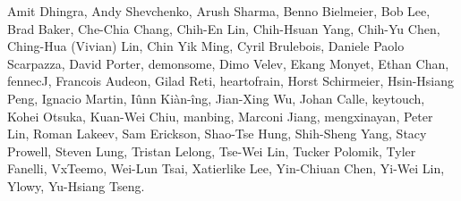 Amit Dhingra,                  %
Andy Shevchenko,               %
Arush Sharma,                  %
Benno Bielmeier,               %
Bob Lee,                       %
Brad Baker,                    %
Che-Chia Chang,                %
Chih-En Lin,                   %
Chih-Hsuan Yang,               %
Chih-Yu Chen,                  %
Ching-Hua (Vivian) Lin,        %
Chin Yik Ming,                 %
Cyril Brulebois,               %
Daniele Paolo Scarpazza,       %
David Porter,                  %
demonsome,                     %
Dimo Velev,                    %
Ekang Monyet,                  %
Ethan Chan,                    %
fennecJ,                       %
Francois Audeon,               %
Gilad Reti,                    %
heartofrain,                   %
Horst Schirmeier,              %
Hsin-Hsiang Peng,              %
Ignacio Martin,                %
Iûnn Kiàn-îng,                 %
Jian-Xing Wu,                  %
Johan Calle,                   %
keytouch,                      %
Kohei Otsuka,                  %
Kuan-Wei Chiu,                 %
manbing,                       %
Marconi Jiang,                 %
mengxinayan,                   %
Peter Lin,                     %
Roman Lakeev,                  %
Sam Erickson,                  %
Shao-Tse Hung,                 %
Shih-Sheng Yang,               %
Stacy Prowell,                 %
Steven Lung,                   %
Tristan Lelong,                %
Tse-Wei Lin,                   %
Tucker Polomik,                %
Tyler Fanelli,                 %
VxTeemo,                       %
Wei-Lun Tsai,                  %
Xatierlike Lee,                %
Yin-Chiuan Chen,               %
Yi-Wei Lin,                    %
Ylowy,                         %
Yu-Hsiang Tseng.               %
